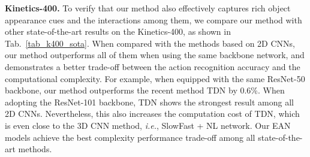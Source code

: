  \textbf {Kinetics-400.}
To verify that our method also effectively captures rich object appearance cues and the interactions among them, we compare our method with other state-of-the-art results on the Kinetics-400, as shown in Tab.~\ref{tab_k400_sota}.
When compared with the methods based on 2D CNNs, our method outperforms all of them when using the same backbone network, and demonstrates a better trade-off between the action recognition accuracy and the computational complexity.
For example, when equipped with the same ResNet-50 backbone, our method outperforms the recent method TDN by 0.6\%.
When adopting the ResNet-101 backbone, TDN shows the strongest result among all 2D CNNs. Nevertheless, this also increases the computation cost of TDN, which is even close to the 3D CNN method, \textit{i.e.}, SlowFast + NL network.
Our EAN models achieve the best complexity performance trade-off among all state-of-the-art methods.



\begin{table}[!b]
\caption{
	Comparison to state-of-the-arts on Diving48.
	We adopt the \textit{single clip or twice clips} inference schemes where a center crop of 224224 from a single clip or twice clips is used.
	 indicates the paper didn't provide the results.
}
	\centering
	
	\label{tab_diving48_sota}
\end{table}

